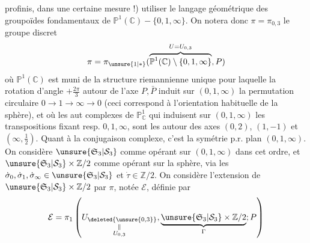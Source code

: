 profinis, dans une certaine mesure !) utiliser le langage géométrique des groupoïdes fondamentaux de $\mathbb P^1(\mathbb C)-\{0,1,\infty\}$. On  notera donc $\pi=\pi_{0,3}$ le groupe discret
\[
\pi=\pi_{\unsure{1|*}}(\overbrace{\mathbb P^1(\mathbb C)\setminus\{0,1,\infty\}}^{U=U_{0,3}},P)
\]
où $\mathbb P^1(\mathbb C)$ est muni de la structure  riemannienne  unique pour laquelle la rotation \inserted{$\dot\rho$} d'angle $+\frac{2\pi}{3}$ autour de l'axe $P,\bar P$  induit sur $(0,1,\infty)$ la permutation circulaire $0\longrightarrow1\longrightarrow\infty\longrightarrow0$ (ceci correspond à l'orientation habituelle de la sphère), et où les aut complexes  de $\mathbb P^1_{\mathbb C}$ qui   induisent  sur $(0,1,\infty)$ les transpositions fixant resp. $0,1,\infty$, sont  les   autour des axes  $(0,2)$, $(1,-1)$ et $(\infty,\frac12)$.
Quant à la conjugaison complexe, c'est la symétrie p.r.  plan $(0,1,\infty)$. On considère $\unsure{\mathfrak S_3|\mathcal S_3}$ comme opérant sur $(0,1,\infty)$ dans cet ordre, et $\unsure{\mathfrak S_3|\mathcal S_3}\times\mathbb Z/2$ comme opérant sur la sphère, via les $\dot\sigma_0,\dot\sigma_1,\dot\sigma_\infty\in\unsure{\mathfrak S_3|\mathcal S_3}$ et $\dot\tau\in\mathbb Z/2$. On considère l'extension  de $\unsure{\mathfrak S_3|\mathcal S_3}\times\mathbb Z/2$ par $\pi$, notée  $\mathcal E$, définie par
\[
\mathcal E=\pi_1\left(\underset{\substack{\Vert\\U_{0,3}}}{U_{\deleted{\unsure{0,3}}}},\underbrace{\unsure{\mathfrak S_3|\mathcal S_3}\times\mathbb Z/2}_{\Gamma};P\right)
\]
